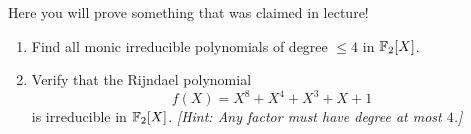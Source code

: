 \begin{problem}
Here you will prove something that was claimed in lecture!
\begin{enumerate}\renewcommand{\itemsep}{3mm}
\item Find all monic irreducible polynomials of degree $\leq 4$ in $\mathbb{F}_2[X]$.
\item Verify that the Rijndael polynomial 
\[ f(X)=X^8+X^4+X^3+X+1 \] is irreducible in $\mathbb{F}_2[X]$.  
\emph{[Hint: Any factor must have degree at most $4$.]}
\end{enumerate}
\end{problem}
